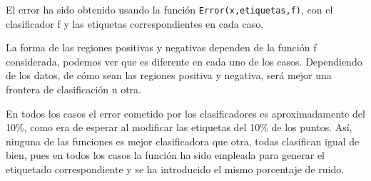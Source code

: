 \documentclass[a4]{article}
\begin{document}
\begin{figure}[H]
	\centering    
	\caption{}
	\label{fig:fronteras2}
\end{figure}

El error ha sido obtenido usando la función \lstinline|Error(x,etiquetas,f)|, con el clasificador f y las etiquetas correspondientes en cada caso. 

La forma de las regiones positivas y negativas dependen de la función f considerada, podemos ver que es diferente en cada uno de los casos. Dependiendo de los datos, de cómo sean las regiones positiva y negativa, será mejor una frontera de clasificación u otra. 

En todos los casos el error cometido por los clasificadores es aproximadamente del 10\%, como era de esperar al modificar las etiquetas del 10\% de los puntos.  Así, ninguna de las funciones es mejor clasificadora que otra, todas clasifican igual de bien, pues en todos los casos la función ha sido empleada para generar el etiquetado correspondiente y se ha introducido el mismo porcentaje de ruido. 
\end{document}
